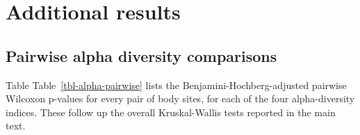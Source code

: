 \documentclass[
  letterpaper,
  DIV=11,
  numbers=noendperiod]{scrartcl}
\begin{document}
\newpage{}

\section{Additional results}\label{additional-results}

\subsection{Pairwise alpha diversity
comparisons}\label{pairwise-alpha-diversity-comparisons}

Table Table~\ref{tbl-alpha-pairwise} lists the
Benjamini-Hochberg-adjusted pairwise Wilcoxon p-values for every pair of
body sites, for each of the four alpha-diversity indices. These follow
up the overall Kruskal-Wallis tests reported in the main text.
\end{document}
